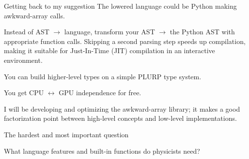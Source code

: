 \documentclass[aspectratio=169]{beamer}
\begin{document}
\begin{frame}{Getting back to my suggestion}
\vspace{0.5 cm}
The lowered language could be Python making awkward-array calls.

\vspace{0.5 cm}
Instead of AST $\to$ language, transform your AST $\to$ the Python AST with appropriate function calls. Skipping a second parsing step speeds up compilation, making it suitable for Just-In-Time (JIT) compilation in an interactive environment.

\vspace{0.5 cm}
You can build higher-level types on a simple PLURP type system.

\vspace{0.5 cm}
You get CPU $\leftrightarrow$ GPU independence for free.

\vspace{0.5 cm}
I will be developing and optimizing the awkward-array library; it makes a good factorization point between high-level concepts and low-level implementations.
\end{frame}

\begin{frame}{The hardest and most important question}
\huge
\vspace{0.5 cm}
\begin{center}
\begin{minipage}{0.8\linewidth}
\begin{center}
What language features and built-in functions do physicists need?
\end{center}
\end{minipage}
\end{center}
\end{frame}
\end{document}
